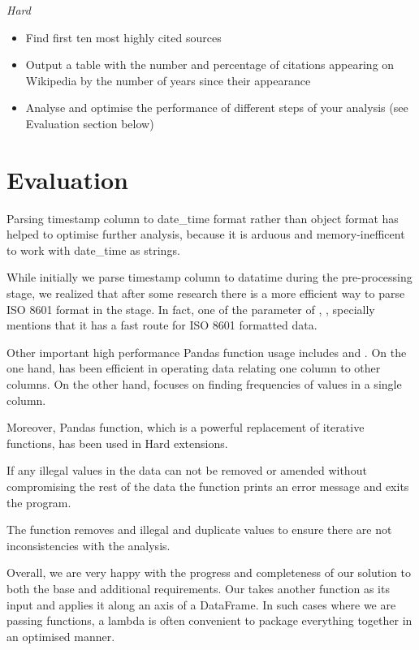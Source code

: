 \documentclass[12pt,a4paper,final]{article}
\begin{document}
\begin{center} \emph{Hard} \end{center}
\begin{itemize}[noitemsep]
    \item Find first ten most highly cited sources
    \item Output a table with the number and percentage of citations appearing on Wikipedia by the number of years since their appearance
    \item Analyse and optimise the performance of different steps of your analysis (see Evaluation section below)
\end{itemize}

\section*{Evaluation}
Parsing timestamp column to date\_time format rather than object format has helped to optimise further analysis, because it is arduous and memory-inefficent to work with date\_time as strings.

While initially we parse timestamp column to datatime during the pre-processing stage, we realized that after some research there is a more efficient way to parse ISO 8601 format in the  stage.
In fact, one of the parameter of , , specially mentions that it has a fast route for ISO 8601 formatted data.

Other important high performance Pandas function usage includes  and . On the one hand,  has been efficient in operating data relating one column to other columns.
On the other hand,  focuses on finding frequencies of values in a single column.

Moreover, Pandas  function, which is a powerful replacement of iterative functions, has been used in Hard extensions.

If any illegal values in the data can not be removed or amended without compromising the rest of the data the  function prints an error message and exits the program.

The  function removes and illegal and duplicate values to ensure there are not inconsistencies with the analysis.

Overall, we are very happy with the progress and completeness of our solution to both the base and additional requirements. Our  takes another function as its input and applies it along an axis of a DataFrame.
In such cases where we are passing functions, a lambda is often convenient to package everything together in an optimised manner.
\end{document}
